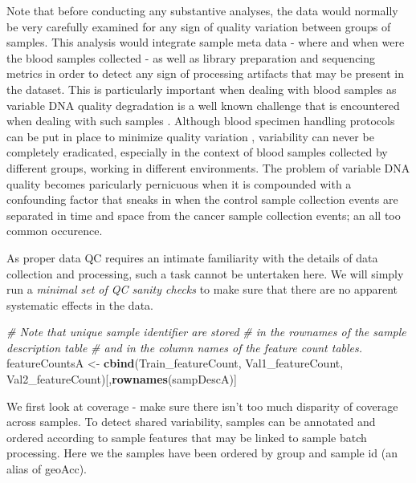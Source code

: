 \documentclass[
]{book}
\newenvironment{Shaded}{\begin{snugshade}}{\end{snugshade}}
\newcommand{\CommentTok}[1]{\textcolor[rgb]{0.56,0.35,0.01}{\textit{#1}}}
\newcommand{\KeywordTok}[1]{\textcolor[rgb]{0.13,0.29,0.53}{\textbf{#1}}}
\newcommand{\NormalTok}[1]{#1}
\newcommand{\StringTok}[1]{\textcolor[rgb]{0.31,0.60,0.02}{#1}}
\begin{document}
Note that before conducting any substantive analyses, the data would normally
be very carefully examined for any sign of quality variation between groups
of samples. This analysis would integrate sample meta data - where and when were
the blood samples collected - as well as library preparation and sequencing metrics
in order to detect any sign of processing artifacts that may be present in the dataset.
This is particularly important when dealing with blood samples as variable
DNA quality degradation is a well known challenge that is encountered when dealing with
such samples \citep{Huang:2017aa}. Although blood specimen handling protocols can be
put in place to minimize quality variation \citep{Permenter:2015aa}, variability
can never be completely eradicated, especially in the context of blood samples
collected by different groups, working in different environments. The problem
of variable DNA quality becomes paricularly pernicuous when it is compounded
with a confounding factor that sneaks in when the control sample collection
events are separated in time and space from the cancer sample collection events;
an all too common occurence.

As proper data QC requires an intimate familiarity with the details of
data collection and processing, such a task cannot be untertaken here.
We will simply run a \emph{minimal set of QC sanity checks} to make sure that
there are no apparent systematic effects in the data.

\begin{Shaded}
\begin{Highlighting}[]
 \CommentTok{\# Note that unique sample identifier are stored }
 \CommentTok{\# in the rownames of the sample description table }
 \CommentTok{\# and in the column names of the feature count tables.}
\NormalTok{  featureCountsA <{-}}\StringTok{ }\KeywordTok{cbind}\NormalTok{(Train\_featureCount, }
\NormalTok{                          Val1\_featureCount, }
\NormalTok{                          Val2\_featureCount)[,}\KeywordTok{rownames}\NormalTok{(sampDescA)]}
\end{Highlighting}
\end{Shaded}

We first look at coverage - make sure there isn't too much disparity of coverage
across samples. To detect shared variability, samples can be annotated and ordered
according to sample features that may be linked to sample batch processing. Here we
the samples have been ordered by group and sample id (an alias of geoAcc).
\end{document}
